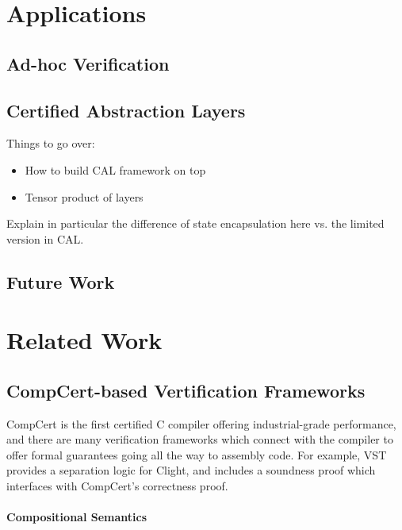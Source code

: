 \documentclass[acmsmall,screen,review,anonymous]{acmart}
\begin{document}

\section{Applications} %

\subsection{Ad-hoc Verification}

\subsection{Certified Abstraction Layers}

Things to go over:
\begin{itemize}
  \item How to build CAL framework on top
  \item Tensor product of layers
\end{itemize}

Explain in particular the difference of state encapsulation here
vs. the limited version in CAL.

\subsection{Future Work}


\section{Related Work} %

\subsection{CompCert-based Vertification Frameworks}

CompCert \cite{compcert}
is the first certified C compiler offering industrial-grade performance,
and there are many verification frameworks which connect with the compiler
to offer formal guarantees going all the way to assembly code.
For example, VST \cite{vst}
provides a separation logic for Clight,
and includes a soundness proof which interfaces with CompCert's correctness proof.

\paragraph{Compositional Semantics}
\end{document}
